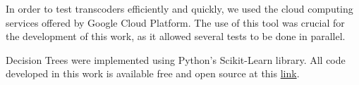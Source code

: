 {In order to test transcoders efficiently and quickly, we used the cloud computing services offered by Google Cloud Platform. The use of this tool was crucial for the development of this work, as it allowed several tests to be done in parallel.

Decision Trees were implemented using Python's Scikit-Learn library. All code developed in this work is available free and open source at this \href{https://github.com/thiagodma/DecisionTrees-Python}{link}.

\begin{singlespace}
{\setfonttimes\normalsize{}}
\end{singlespace}
}
